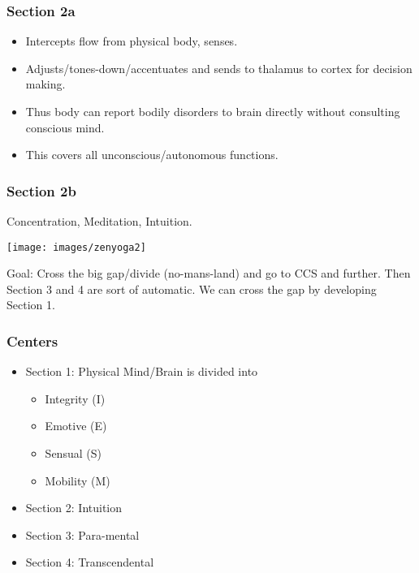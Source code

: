 \begin{frame}[fragile]
\frametitle{Section 2a}
\begin{itemize}
\item Intercepts flow from physical body, senses.
\item Adjusts/tones-down/accentuates and sends to thalamus to cortex for decision making.
\item Thus body can report bodily disorders to brain directly without consulting conscious mind.
\item This covers all unconscious/autonomous functions.
\end{itemize}
\end{frame}

\begin{frame}[fragile]
\frametitle{Section 2b}
Concentration, Meditation, Intuition.

 \begin{center}
\texttt{[image: images/zenyoga2]}
\end{center}

Goal: Cross the big gap/divide (no-mans-land) and go to CCS and further. Then Section 3 and 4 are sort of automatic.
We can cross the gap by developing Section 1.

\end{frame}

\begin{frame}[fragile]
\frametitle{Centers}

\begin{itemize}
\item Section 1: Physical Mind/Brain is divided into
\begin{itemize}
\item Integrity (I)
\item Emotive (E)
\item Sensual (S)
\item Mobility (M)
\end{itemize}
\item Section 2: Intuition
\item Section 3: Para-mental
\item Section 4: Transcendental
\end{itemize}

\end{frame}


